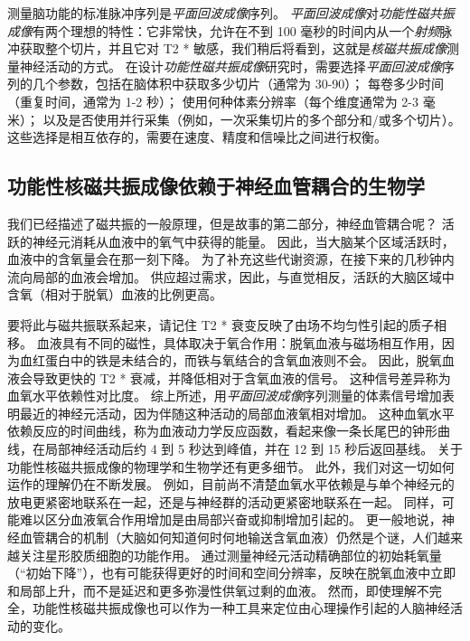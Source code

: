 测量脑功能的标准脉冲序列是\textit{平面回波成像}序列。 
\textit{平面回波成像}对\textit{功能性磁共振成像}有两个理想的特性：它非常快，允许在不到 100 毫秒的时间内从一个\textit{射频}脉冲获取整个切片，并且它对 T2 * 敏感，我们稍后将看到，这就是\textit{核磁共振成像}测量神经活动的方式。 
在设计\textit{功能性磁共振成像}研究时，需要选择\textit{平面回波成像}序列的几个参数，包括在脑体积中获取多少切片（通常为 30-90）； 
每卷多少时间（重复时间，通常为 1-2 秒）； 使用何种体素分辨率（每个维度通常为 2-3 毫米）； 
以及是否使用并行采集（例如，一次采集切片的多个部分和/或多个切片）。
这些选择是相互依存的，需要在速度、精度和信噪比之间进行权衡。



\subsection{功能性核磁共振成像依赖于神经血管耦合的生物学}

我们已经描述了磁共振的一般原理，但是故事的第二部分，神经血管耦合呢？
活跃的神经元消耗从血液中的氧气中获得的能量。 
因此，当大脑某个区域活跃时，血液中的含氧量会在那一刻下降。
为了补充这些代谢资源，在接下来的几秒钟内流向局部的血液会增加。
供应超过需求，因此，与直觉相反，活跃的大脑区域中含氧（相对于脱氧）血液的比例更高。


要将此与磁共振联系起来，请记住 T2 * 衰变反映了由场不均匀性引起的质子相移。 
血液具有不同的磁性，具体取决于氧合作用：脱氧血液与磁场相互作用，因为血红蛋白中的铁是未结合的，而铁与氧结合的含氧血液则不会。
因此，脱氧血液会导致更快的 T2 * 衰减，并降低相对于含氧血液的信号。
这种信号差异称为血氧水平依赖性对比度。 
综上所述，用\textit{平面回波成像}序列测量的体素信号增加表明最近的神经元活动，因为伴随这种活动的局部血液氧相对增加。
这种血氧水平依赖反应的时间曲线，称为血液动力学反应函数，看起来像一条长尾巴的钟形曲线，在局部神经活动后约 4 到 5 秒达到峰值，并在 12 到 15 秒后返回基线。
关于功能性核磁共振成像的物理学和生物学还有更多细节。 
此外，我们对这一切如何运作的理解仍在不断发展。 
例如，目前尚不清楚血氧水平依赖是与单个神经元的放电更紧密地联系在一起，还是与神经群的活动更紧密地联系在一起。
同样，可能难以区分血液氧合作用增加是由局部兴奋或抑制增加引起的。 
更一般地说，神经血管耦合的机制（大脑如何知道何时何地输送含氧血液）仍然是个谜，人们越来越关注星形胶质细胞的功能作用。 
通过测量神经元活动精确部位的初始耗氧量（“初始下降”），也有可能获得更好的时间和空间分辨率，反映在脱氧血液中立即和局部上升，而不是延迟和更多弥漫性供氧过剩的血液。 
然而，即使理解不完全，功能性核磁共振成像也可以作为一种工具来定位由心理操作引起的人脑神经活动的变化。



